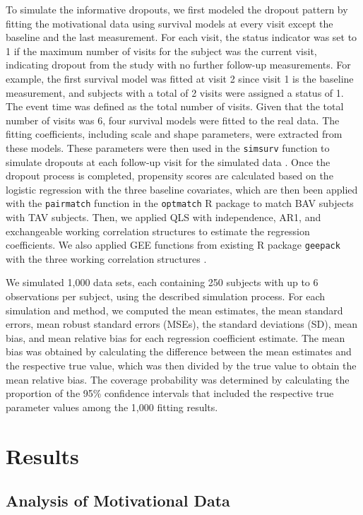 \documentclass[
]{aft}
\begin{document}
To simulate the informative dropouts, we first modeled the dropout
pattern by fitting the motivational data using survival models at every
visit except the baseline and the last measurement. For each visit, the
status indicator was set to 1 if the maximum number of visits for the
subject was the current visit, indicating dropout from the study with no
further follow-up measurements. For example, the first survival model
was fitted at visit 2 since visit 1 is the baseline measurement, and
subjects with a total of 2 visits were assigned a status of 1. The event
time was defined as the total number of visits. Given that the total
number of visits was 6, four survival models were fitted to the real
data. The fitting coefficients, including scale and shape parameters,
were extracted from these models. These parameters were then used in the
\texttt{simsurv} function to simulate dropouts at each follow-up visit
for the simulated data \citep{simsurv20}. Once the dropout process is
completed, propensity scores are calculated based on the logistic
regression with the three baseline covariates, which are then been
applied with the \texttt{pairmatch} function in the \texttt{optmatch} R
package to match BAV subjects with TAV subjects. Then, we applied QLS
with independence, AR1, and exchangeable working correlation structures
to estimate the regression coefficients. We also applied GEE functions
from existing R package \texttt{geepack} with the three working
correlation structures \citep{Hojsgaard2006}.

We simulated 1,000 data sets, each containing 250 subjects with up to 6
observations per subject, using the described simulation process. For
each simulation and method, we computed the mean estimates, the mean
standard errors, mean robust standard errors (MSEs), the standard
deviations (SD), mean bias, and mean relative bias for each regression
coefficient estimate. The mean bias was obtained by calculating the
difference between the mean estimates and the respective true value,
which was then divided by the true value to obtain the mean relative
bias. The coverage probability was determined by calculating the
proportion of the 95\% confidence intervals that included the respective
true parameter values among the 1,000 fitting results.

\section{Results}\label{results}

\subsection{Analysis of Motivational
Data}\label{analysis-of-motivational-data}
\end{document}
